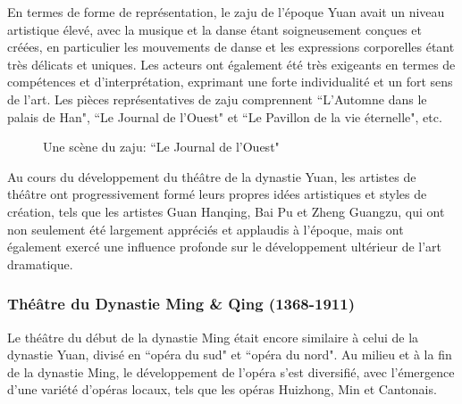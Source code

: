 \documentclass[UTF8,a4paper,12pt]{ctexart}
\numberwithin{equation}{section}
\newcommand{\mycite}[1]{\cite{#1}}
\begin{document}
En termes de forme de représentation, le zaju de l'époque Yuan avait un niveau artistique élevé, avec la musique et la danse étant soigneusement conçues et créées, en particulier les mouvements de danse et les expressions corporelles étant très délicats et uniques. Les acteurs ont également été très exigeants en termes de compétences et d'interprétation, exprimant une forte individualité et un fort sens de l'art. Les pièces représentatives de zaju comprennent ``L'Automne dans le palais de Han", ``Le Journal de l'Ouest" et ``Le Pavillon de la vie éternelle", etc\mycite{11}.
\begin{figure}[H] 
\caption{Une scène du zaju: ``Le Journal de l'Ouest"}
\end{figure}
Au cours du développement du théâtre de la dynastie Yuan, les artistes de théâtre ont progressivement formé leurs propres idées artistiques et styles de création, tels que les artistes Guan Hanqing, Bai Pu et Zheng Guangzu, qui ont non seulement été largement appréciés et applaudis à l'époque, mais ont également exercé une influence profonde sur le développement ultérieur de l'art dramatique. 

\subsubsection{Théâtre du Dynastie Ming \& Qing (1368-1911)}
Le théâtre du début de la dynastie Ming était encore similaire à celui de la dynastie Yuan, divisé en ``opéra du sud" et ``opéra du nord". Au milieu et à la fin de la dynastie Ming, le développement de l'opéra s'est diversifié, avec l'émergence d'une variété d'opéras locaux, tels que les opéras Huizhong, Min et Cantonais.
\end{document}
